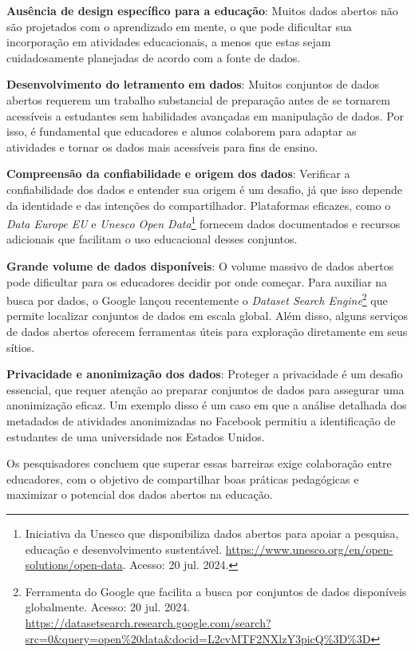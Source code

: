 \documentclass[portuguese]{textolivre}
\begin{document}
\textbf{Ausência de design específico para a educação}: Muitos dados abertos não são projetados com o aprendizado em mente, o que pode dificultar sua incorporação em atividades educacionais, a menos que estas sejam cuidadosamente planejadas de acordo com a fonte de dados.

\textbf{Desenvolvimento do letramento em dados}: Muitos conjuntos de dados abertos requerem um trabalho substancial de preparação antes de se tornarem acessíveis a estudantes sem habilidades avançadas em manipulação de dados. Por isso, é fundamental que educadores e alunos colaborem para adaptar as atividades e tornar os dados mais acessíveis para fins de ensino.

\textbf{Compreensão da confiabilidade e origem dos dados}: Verificar a confiabilidade dos dados e entender sua origem é um desafio, já que isso depende da identidade e das intenções do compartilhador. Plataformas eficazes, como o \textit{Data Europe EU} e \textit{Unesco Open Data}\footnote{Iniciativa da Unesco que disponibiliza dados abertos para apoiar a pesquisa, educação e desenvolvimento sustentável. \url{https://www.unesco.org/en/open-solutions/open-data}. Acesso: 20 jul. 2024.} fornecem dados documentados e recursos adicionais que facilitam o uso educacional desses conjuntos.

\textbf{Grande volume de dados disponíveis}: O volume massivo de dados abertos pode dificultar para os educadores decidir por onde começar. Para auxiliar na busca por dados, o Google lançou recentemente o \textit{Dataset Search Engine}\footnote{Ferramenta do Google que facilita a busca por conjuntos de dados disponíveis globalmente. Acesso: 20 jul. 2024. \url{https://datasetsearch.research.google.com/search?src=0\&query=open\%20data\&docid=L2cvMTF2NXlzY3picQ\%3D\%3D}} que permite localizar conjuntos de dados em escala global. Além disso, alguns serviços de dados abertos oferecem ferramentas úteis para exploração diretamente em seus sítios.

\textbf{Privacidade e anonimização dos dados}: Proteger a privacidade é um desafio essencial, que requer atenção ao preparar conjuntos de dados para assegurar uma anonimização eficaz. Um exemplo disso é um caso em que a análise detalhada dos metadados de atividades anonimizadas no Facebook permitiu a identificação de estudantes de uma universidade nos Estados Unidos.

Os pesquisadores concluem que superar essas barreiras exige colaboração entre educadores, com o objetivo de compartilhar boas práticas pedagógicas e maximizar o potencial dos dados abertos na educação.
\end{document}
